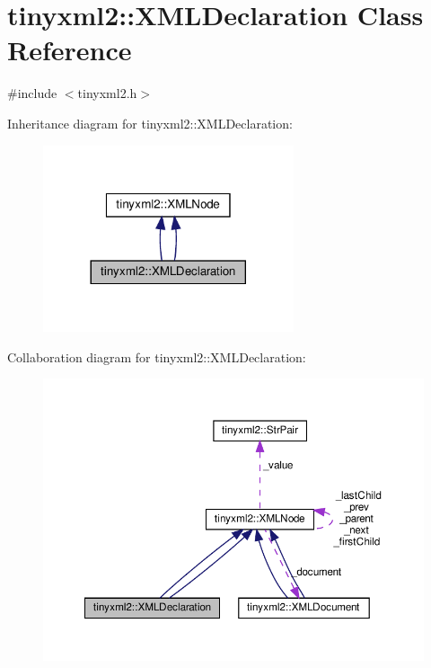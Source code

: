\hypertarget{classtinyxml2_1_1XMLDeclaration}{}\section{tinyxml2\+:\+:X\+M\+L\+Declaration Class Reference}
\label{classtinyxml2_1_1XMLDeclaration}


{\ttfamily \#include $<$tinyxml2.\+h$>$}



Inheritance diagram for tinyxml2\+:\+:X\+M\+L\+Declaration\+:
\nopagebreak
\begin{figure}[H]
\begin{center}
\leavevmode
\includegraphics[width=209pt]{classtinyxml2_1_1XMLDeclaration__inherit__graph}
\end{center}
\end{figure}


Collaboration diagram for tinyxml2\+:\+:X\+M\+L\+Declaration\+:
\nopagebreak
\begin{figure}[H]
\begin{center}
\leavevmode
\includegraphics[width=350pt]{classtinyxml2_1_1XMLDeclaration__coll__graph}
\end{center}
\end{figure}
